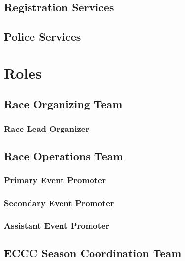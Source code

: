 \documentclass[
  letterpaper, %
  fontsize=10pt, %
  twoside=true,
  chapterentrydots=true, %
  numbers=noenddot,
  fontmethod=tex,
]{kaobook}
\begin{document}
\section{Registration Services}

\section{Police Services}

\setchapterpreamble[u]{\margintoc}
\chapter{Roles}

\section{Race Organizing Team}
\label{role:race_org_team}

\subsection{Race Lead Organizer}
\label{role:lead_org}

\section{Race Operations Team}
\label{role:race_ops_team}

\subsection{Primary Event Promoter}
\label{role:primary_promoter}

\subsection{Secondary Event Promoter}
\label{role:secondary_promoter}

\subsection{Assistant Event Promoter}
\label{role:assistant_promoter}

\section{ECCC Season Coordination Team}
\label{role:eccc_coordination_team}
\end{document}
